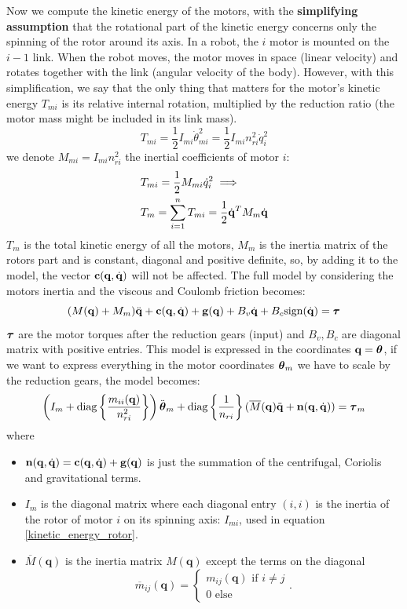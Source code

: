\documentclass[10pt, a4paper]{report}
\newcommand{\q}{{\mathbf q}}
\begin{document}
Now we compute the kinetic energy of the motors, with the \textbf{simplifying assumption} that the rotational part of the kinetic energy concerns only the spinning of the rotor around its axis. In a robot, the $i$ motor is mounted on the $i-1$ link. When the robot moves, the motor moves in space (linear velocity) and rotates together with the link (angular velocity of the body). However, with this simplification, we say that the only thing that matters for the motor's kinetic energy $T_{mi}$ is its relative internal rotation, multiplied by the reduction ratio (the motor mass might be included in its link mass).\begin{equation}\label{kinetic_energy_rotor}
    T_{mi}=\frac{1}{2}I_{mi}\dot \theta_{mi}^2=\frac{1}{2}I_{mi}n_{ri}^2\dot q_i^2
\end{equation}
we denote $M_{mi}=I_{mi}n_{ri}^2$ the inertial coefficients of motor $i$:\begin{align}
    &T_{mi}=\frac{1}{2}M_{mi}\dot q_i^2\implies \\ 
    &T_m = \sum_{i=1}^n T_{mi}=\frac{1}{2}{\dot{\mathbf q}}^T M_m {\dot{\mathbf q}} 
\end{align}
$T_m$ is the total kinetic energy of all the motors, $M_m$ is the inertia matrix of the rotors part and is constant, diagonal and positive definite, so, by adding it to the model, the vector $\mathbf c(\q,\dq)$ will not be affected. The full model by considering the motors inertia and the viscous and Coulomb friction becomes:\begin{equation}
    (M(\q)+M_m)\ddq+\mathbf c(\q,\dq)+\mathbf g(\q)+B_v\dq+B_c\text{sign}(\dq)=\btau 
\end{equation}
${\boldsymbol{\tau}}$ are the motor torques after the reduction gears (input) and $B_v,B_c$ are diagonal matrix with positive entries. This model is expressed in the coordinates $\q=\btheta$, if we want to express everything in the motor coordinates ${\boldsymbol{\theta}}_m$ we have to scale by the reduction gears, the model becomes:\begin{equation}
    \left(
        I_m + \text{diag} \left\{\frac{m_{ii}(\q)}{n_{ri}^2}\right\} 
    \right)\ddot{\btheta}_m + 
    \text{diag} \left\{\frac{1}{n_{ri}}\right\}(\overline M(\q)\ddq+\mathbf n(\q,\dq))=\btau_m
\end{equation}
where\begin{itemize}
    \item $\mathbf n(\q,\dq)=\mathbf c(\q,\dq)+\mathbf g(\q)$ is just the summation of the centrifugal, Coriolis and gravitational terms. 
    \item $I_m$ is the diagonal matrix where each diagonal entry $(i,i)$ is the inertia of the  rotor of motor $i$ on its spinning axis: $I_{mi}$, used in equation \eqref{kinetic_energy_rotor}.
    \item $\overline M(\q)$ is the inertia matrix $M(\q)$ except the terms on the diagonal
    \begin{equation}
        \overline m_{ij}(\q)=\begin{cases}
            m_{ij}(\q) \text{ if }i\ne j\\ 
            0 \text{ else}
        \end{cases}.
    \end{equation}
\end{itemize}
\end{document}

